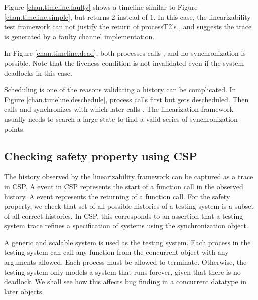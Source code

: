 \documentclass{article}
\begin{document}

Figure \ref{chan.timeline.faulty} shows a timeline similar to Figure \ref{chan.timeline.simple}, but  returns $2$ instead of $1$. In this case, the linearizability test framework can not justify the return of process{T2}'s , and suggests the trace is generated by a faulty channel implementation. 

In Figure \ref{chan.timeline.dead}, both processes calls , and no synchronization is possible. Note that the liveness condition is not invalidated even if the system deadlocks in this case.

Scheduling is one of the reasons validating a history can be complicated. In Figure \ref{chan.timeline.deschedule}, process  calls  first but gets descheduled. Then  calls  and synchronizes with  which later calls . The linearization framework usually needs to search a large state to find a valid series of synchronization points. 

\subsection{Checking safety property using CSP} 
The history observed by the linearizability framework can be captured as a trace in CSP. A  event in CSP represents the start of a function call in the observed history. A  event represents the returning of a function call. For the safety property, we check that set of all possible histories of a testing system is a subset of all correct histories. In CSP, this corresponds to an assertion that a testing system trace refines a specification of systems using the synchronization object. 

A generic and scalable system is used as the testing system. Each process in the testing system can call any function from the concurrent object with any arguments allowed. Each process must be allowed to terminate. Otherwise, the testing system only models a system that runs forever, given that there is no deadlock. We shall see how this affects bug finding in a concurrent datatype in later objects.
\end{document}
